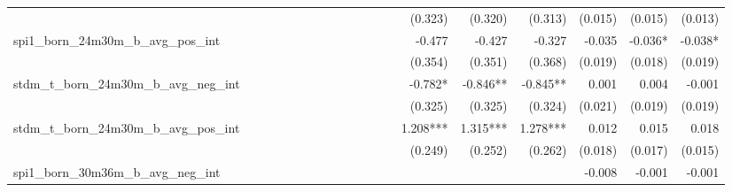 \begin{tabular}{lrrrrrrrrrrrrrrrrrr}
                                            &              &              &              &              &              &              &              &              &               &              &              &               &      (0.323) &      (0.320) &       (0.313) &      (0.015) &      (0.015) &       (0.013) \\ 
spi1\_born\_24m30m\_b\_avg\_pos\_int        &              &              &              &              &              &              &              &              &               &              &              &               &       -0.477 &       -0.427 &        -0.327 &       -0.035 &      -0.036* &       -0.038* \\ 
                                            &              &              &              &              &              &              &              &              &               &              &              &               &      (0.354) &      (0.351) &       (0.368) &      (0.019) &      (0.018) &       (0.019) \\ 
stdm\_t\_born\_24m30m\_b\_avg\_neg\_int     &              &              &              &              &              &              &              &              &               &              &              &               &      -0.782* &     -0.846** &      -0.845** &        0.001 &        0.004 &        -0.001 \\ 
                                            &              &              &              &              &              &              &              &              &               &              &              &               &      (0.325) &      (0.325) &       (0.324) &      (0.021) &      (0.019) &       (0.019) \\ 
stdm\_t\_born\_24m30m\_b\_avg\_pos\_int     &              &              &              &              &              &              &              &              &               &              &              &               &     1.208*** &     1.315*** &      1.278*** &        0.012 &        0.015 &         0.018 \\ 
                                            &              &              &              &              &              &              &              &              &               &              &              &               &      (0.249) &      (0.252) &       (0.262) &      (0.018) &      (0.017) &       (0.015) \\ 
spi1\_born\_30m36m\_b\_avg\_neg\_int        &              &              &              &              &              &              &              &              &               &              &              &               &              &              &               &       -0.008 &       -0.001 &        -0.001 \\ 

\end{tabular}
